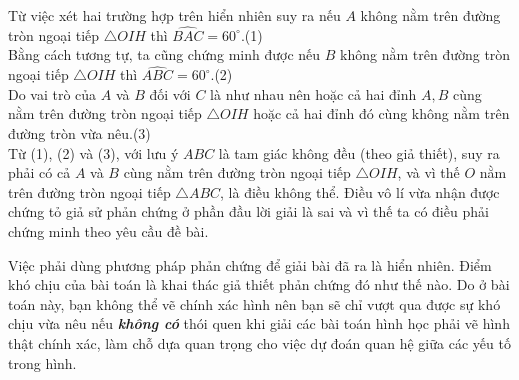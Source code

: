 \begin{bt}
{\begin{itemize}
		\end{itemize}
		Từ việc xét hai trường hợp trên hiển nhiên suy ra nếu $A$ không nằm trên đường tròn ngoại tiếp $\triangle OIH$ thì $\widehat{BAC}=60^\circ$.\hfill (1)\\
		Bằng cách tương tự, ta cũng chứng minh được nếu $B$ không nằm trên đường tròn ngoại tiếp $\triangle OIH$ thì $\widehat{ABC}=60^\circ$.\hfill (2)\\
		Do vai trò của $A$ và $B$ đối với $C$ là như nhau nên hoặc cả hai đỉnh $A,B$ cùng nằm trên đường tròn ngoại tiếp $\triangle OIH$ hoặc cả hai đỉnh đó cùng không nằm trên đường tròn vừa nêu.\hfill (3)\\
		Từ (1), (2) và (3), với lưu ý $ABC$ là tam giác không đều (theo giả thiết), suy ra phải có cả $A$ và $B$ cùng nằm trên đường tròn ngoại tiếp $\triangle OIH$, và vì thế $O$ nằm trên đường tròn ngoại tiếp $\triangle ABC$, là điều không thể. Điều vô lí vừa nhận được chứng tỏ giả sử phản chứng ở phần đầu lời giải là sai và vì thế ta có điều phải chứng minh theo yêu cầu đề bài.
		\begin{nx}
			Việc phải dùng phương pháp phản chứng để giải bài đã ra là hiển nhiên. Điểm khó chịu của bài toán là khai thác giả thiết phản chứng đó như thế nào. Do ở bài toán này, bạn không thể vẽ chính xác hình nên bạn sẽ chỉ vượt qua được sự khó chịu vừa nêu nếu \textit{\textbf{không có}} thói quen khi giải các bài toán hình học phải vẽ hình thật chính xác, làm chỗ dựa quan trọng cho việc dự đoán quan hệ giữa các yếu tố trong hình.
		\end{nx}
}
\end{bt}


